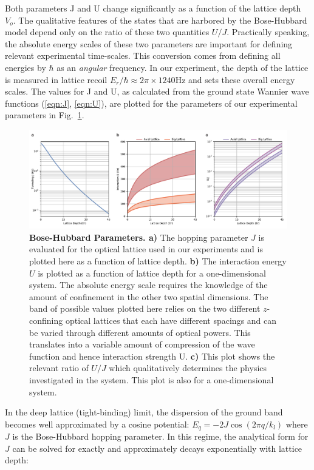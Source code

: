 Both parameters J and U change significantly as a function of the lattice depth $V_o$. The qualitative features of the states that are harbored by the Bose-Hubbard model depend only on the ratio of these two quantities $U/J$. Practically speaking, the absolute energy scales of these two parameters are important for defining relevant experimental time-scales. This conversion comes from defining all energies by $\hbar$ as an \emph{angular} frequency. In our experiment, the depth of the lattice is measured in lattice recoil $E_r/\hbar \approx 2\pi \times 1240 \mathrm{Hz}$ and sets these overall energy scales. The values for J and U, as calculated from the ground state Wannier wave functions (\ref{eqn:J}, \ref{eqn:U}), are plotted for the parameters of our experimental parameters in Fig.~\ref{fig:BHP}. 

\begin{figure}[t!]
		\includegraphics[width=\columnwidth]{figures/ch1/BHParams/BHParams_2.pdf} 
		\caption{\textbf{Bose-Hubbard Parameters. a)} The hopping parameter $J$ is evaluated for the optical lattice used in our experiments and is plotted here as a function of lattice depth. \textbf{b)} The interaction energy $U$ is plotted as a function of lattice depth for a one-dimensional system. The absolute energy scale requires the knowledge of the amount of confinement in the other two spatial dimensions. The band of possible values plotted here relies on the two different $z$-confining optical lattices that each have different spacings and can be varied through different amounts of optical powers. This translates into a variable amount of compression of the wave function and hence interaction strength U. \textbf{c)} This plot shows the relevant ratio of $U/J$ which qualitatively determines the physics investigated in the system. This plot is also for a one-dimensional system. }
		\label{fig:BHP}	
\end{figure}

In the deep lattice (tight-binding) limit, the dispersion of the ground band becomes well approximated by a cosine potential: $E_q = - 2 J \cos{\left (2 \pi q/k_l \right )}$ where $J$ is the Bose-Hubbard hopping parameter. In this regime, the analytical form for $J$ can be solved for exactly and approximately decays exponentially with lattice depth:

